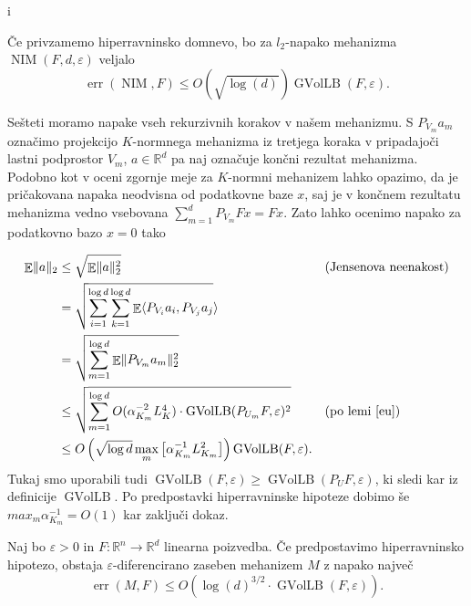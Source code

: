 i\documentclass[mat1]{fmfdelo}
\DeclarePairedDelimiter{\norm}{\lVert}{\rVert}
\newcommand{\R}{\mathbb R}
\DeclareMathOperator*{\E}{\mathbb E}
\DeclareMathOperator{\NIM}{NIM}
\DeclareMathOperator*{\err}{err}
\newcommand{\query}{F: \R^n \to \R^d}
\begin{document}
\begin{lema} \label{nimerr}
    Če privzamemo hiperravninsko domnevo, bo za $l_2$-napako mehanizma $\NIM(F,d,\varepsilon)$ veljalo
    \begin{equation*}
        \err(\NIM, F)  \leq O(\sqrt{\log(d)}) \operatorname{GVolLB}(F, \varepsilon).
    \end{equation*}
\end{lema}

\begin{dokaz}
    Sešteti moramo napake vseh rekurzivnih korakov v našem mehanizmu. S $P_{V_m}a_m$ označimo projekcijo $K$-normnega mehanizma iz tretjega koraka v pripadajoči lastni podprostor $V_m$, $a \in \R^d$ pa naj označuje končni rezultat mehanizma. Podobno kot v oceni zgornje meje za $K$-normni mehanizem lahko opazimo, da je pričakovana napaka neodvisna od podatkovne baze $x$, saj je v končnem rezultatu mehanizma vedno vsebovana $\sum_{m=1}^d P_{V_m} Fx = Fx$. Zato lahko ocenimo napako za podatkovno bazo $x=0$ tako
    
    \begin{align*}
        \E \norm{a}_2 &\leq \sqrt{\E \norm{a}_2^2}  && \text{(Jensenova neenakost)} \\
        &= \sqrt{\sum_{i=1}^{\log d} \sum_{k=1}^{\log d} \E \langle P_{V_i}a_i, P_{V_j}a_j} \rangle \\ 
        &= \sqrt{ \sum_{m=1}^{\log d} \E \norm{P_{V_m}a_m}_2^2} \\
        &\leq \sqrt{ \sum_{m=1}^{\log d} O(\alpha_{K_m}^{-2} L_K^4) \cdot \operatorname{GVolLB}(P_{U_m} F, \varepsilon)^2} && \text{(po lemi \ref{eu})} \\
        &\leq O\left(\sqrt{\log d} \max_m \left[\alpha_{K_m}^{-1} L_{K_m}^2\right]\right) \operatorname{GVolLB}(F,\varepsilon).
    \end{align*}    
    Tukaj smo uporabili tudi $\operatorname{GVolLB}(F,\varepsilon) \geq \operatorname{GVolLB}(P_UF,\varepsilon)$, ki sledi kar iz definicije $\operatorname{GVolLB}$. Po predpostavki hiperravninske hipoteze dobimo še $max_m \alpha_{K_m}^{-1} = O(1)$ kar zaključi dokaz.
\end{dokaz}

\begin{posledica} 
    Naj bo $\varepsilon > 0$ in $\query$ linearna poizvedba. Če predpostavimo hiperravninsko hipotezo, obstaja $\varepsilon$-diferencirano zaseben mehanizem $M$ z napako največ
    \begin{equation*}
        \err(M,F) \leq O(\log(d)^{3/2} \cdot \operatorname{GVolLB}(F, \varepsilon)).
    \end{equation*}
\end{posledica}
\end{document}
